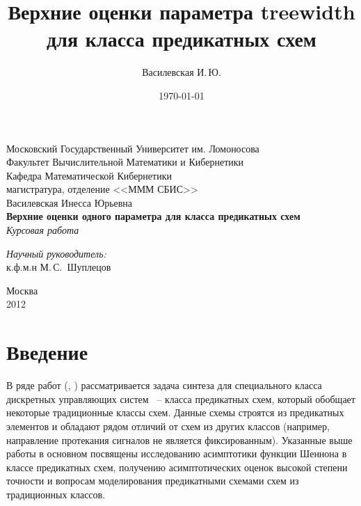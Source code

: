 \documentclass[12pt]{article}
\title{Верхние оценки параметра treewidth для класса предикатных схем}
\author{Василевская И.\,Ю.}
\date{\today}
\begin{document}
    \begin{titlepage}
        \begin{center}
            Московский Государственный Университет им. Ломоносова\\
            Факультет Вычислительной Математики и Кибернетики\\
            Кафедра Математической Кибернетики\\
            магистратура, отделение <<МММ СБИС>>\\[6cm]

            \large {Василевская Инесса Юрьевна}\\
            \LARGE \textbf {Верхние оценки одного параметра для класса предикатных схем}\\[0.8cm]
            \large \emph {Курсовая работа}\\[5.0cm]

            \begin{flushright}
                \large
                \begin{minipage}{0.40\textwidth}
                    \begin{flushleft}
                        \emph{Научный руководитель:}\\к.ф.м.н М.\,С.~Шуплецов
                    \end{flushleft}
                \end{minipage}
            \end{flushright}

            \vfill
            Москва\\
			2012
        \end{center}
    \end{titlepage}

\setcounter{page}{2}

\section{Введение}
\label{beginning}
В ряде работ (\cite{Shu09}, \cite{Shu11}) рассматривается задача синтеза для специального класса дискретных управляющих систем ~--
класса предикатных схем, который обобщает некоторые традиционные классы схем. Данные схемы строятся из предикатных элементов
и обладают рядом отличий от схем из других классов (например, направление протекания сигналов не является фиксированным).
Указанные выше работы в основном посвящены исследованию асимптотики функции Шеннона в классе предикатных схем,
 получению асимптотических оценок высокой степени точности и вопросам моделирования предикатными схемами схем из традиционных классов.
\end{document}
